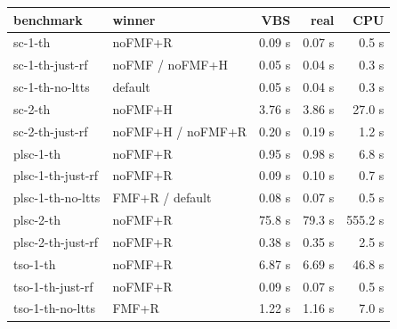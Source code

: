 \begin{tabular}{@{}llrrr@{}}
\toprule
benchmark & winner & VBS & real & CPU \\
\midrule
sc-1-th & noFMF+R & 0.09 s & 0.07 s & 0.5 s \\
sc-1-th-just-rf & noFMF / noFMF+H & 0.05 s & 0.04 s & 0.3 s \\
sc-1-th-no-ltts & default & 0.05 s & 0.04 s & 0.3 s \\
sc-2-th & noFMF+H & 3.76 s & 3.86 s & 27.0 s \\
sc-2-th-just-rf & noFMF+H / noFMF+R & 0.20 s & 0.19 s & 1.2 s \\
plsc-1-th & noFMF+R & 0.95 s & 0.98 s & 6.8 s \\
plsc-1-th-just-rf & noFMF+R & 0.09 s & 0.10 s & 0.7 s \\
plsc-1-th-no-ltts & FMF+R / default & 0.08 s & 0.07 s & 0.5 s \\
plsc-2-th & noFMF+R & 75.8 s & 79.3 s & 555.2 s \\
plsc-2-th-just-rf & noFMF+R & 0.38 s & 0.35 s & 2.5 s \\
tso-1-th & noFMF+R & 6.87 s & 6.69 s & 46.8 s \\
tso-1-th-just-rf & noFMF+R & 0.09 s & 0.07 s & 0.5 s \\
tso-1-th-no-ltts & FMF+R & 1.22 s & 1.16 s & 7.0 s \\
\bottomrule
\end{tabular}
